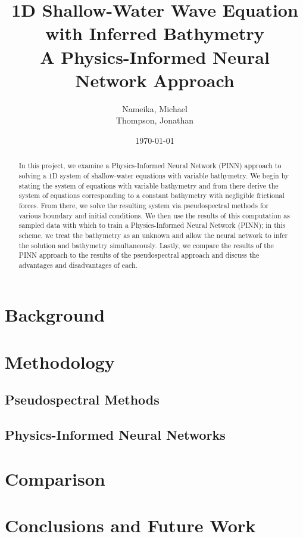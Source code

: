 \documentclass[letterpaper,12pt]{article}
\begin{document}
    \title{%
        1D Shallow-Water Wave Equation with Inferred Bathymetry\\
        \large A Physics-Informed Neural Network Approach
    }
    \author{%
        Nameika, Michael \\
        Thompson, Jonathan
    }
    \date{\today}
    \maketitle

    \begin{abstract}
        In this project, we examine a Physics-Informed Neural Network (PINN) approach to solving a 1D system of 
        shallow-water equations with variable bathymetry. We begin by stating the system of equations with variable
        bathymetry and from there derive the system of equations corresponding to a constant bathymetry with negligible
        frictional forces. From there, we solve the resulting system via pseudospectral methods for various boundary
        and initial conditions. We then use the results of this computation as sampled data with which to train a 
        Physics-Informed Neural Network (PINN); in this scheme, we treat the bathymetry as an unknown and allow the 
        neural network to infer the solution and bathymetry simultaneously. Lastly, we compare the results of the PINN
        approach to the results of the pseudospectral approach and discuss the advantages and disadvantages of each.
    \end{abstract}

    \section{Background}\label{sec:background}

    

    \section{Methodology}\label{sec:proposed-methodology}

    \subsection{Pseudospectral Methods}\label{subsec:pseudospectral-methodology}
     
    

    \subsection{Physics-Informed Neural Networks}\label{subsec:pinn-methodology}

    

    \section{Comparison}\label{sec:comparison}
    
    \section{Conclusions and Future Work}\label{sec:conclusion}

    \pagebreak

    
    

    \pagebreak
    \appendix
\end{document}
